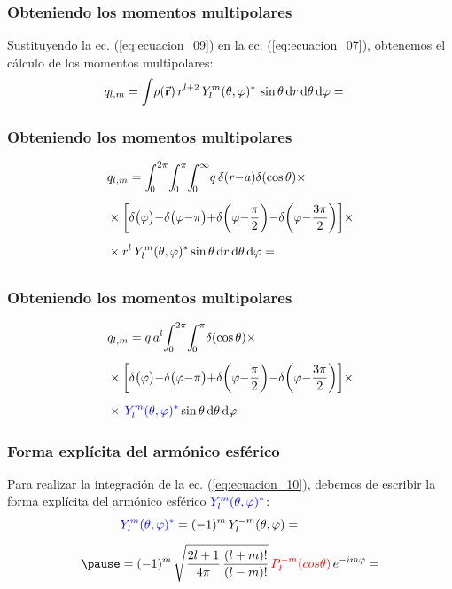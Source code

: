 \documentclass[12pt]{beamer}
\begin{document}
\begin{frame}
\frametitle{Obteniendo los momentos multipolares}
Sustituyendo la ec. (\ref{eq:ecuacion_09}) en la ec. (\ref{eq:ecuacion_07}), obtenemos el cálculo de los momentos multipolares:
\pause
\begin{align*}
&q_{l,m} = \scaleint{5ex} \rho (\va{r}) \, r^{l+2} \, Y_{l}^{m} (\theta, \varphi)^{*} \, \sin \theta \dd{r} \dd{\theta} \dd{\varphi} = 
\end{align*}
\end{frame}
\begin{frame}
\frametitle{Obteniendo los momentos multipolares}
\begin{eqnarray*}
\begin{aligned}
&q_{l,m} = \scaleint{5ex}_{\bs 0}^{2 \pi} \scaleint{5ex}_{\bs 0}^{\pi} \scaleint{5ex}_{\bs 0}^{\infty} q \, \delta(r {-} a) \delta(\cos \theta) \times \\[0.5em] 
&\times \bigg[ \delta \big(\varphi \big) {-} \delta \big(\varphi {-} \pi \big) {+} \delta \bigg( \varphi {-} \dfrac{\pi}{2} \bigg) {-} \delta \bigg(\varphi {-} \dfrac{3 \pi}{2} \bigg) \bigg] \times \\[0.5em]
&\times r^{l} \, Y_{l}^{m} (\theta, \varphi)^{*} \sin \theta \dd{r} \dd{\theta} \dd{\varphi} = \\[0.5em]
\end{aligned}
\end{eqnarray*}
\end{frame}
\begin{frame}
\frametitle{Obteniendo los momentos multipolares}
\begin{eqnarray}
\begin{aligned}[b]
&q_{l,m} = q \, a^{l} \scaleint{5ex}_{\bs 0}^{2 \pi} \scaleint{5ex}_{\bs 0}^{\pi} \delta(\cos \theta) \times \\[0.5em]
&\times \bigg[ \delta \big(\varphi \big) {-} \delta \big(\varphi {-} \pi \big) {+} \delta \bigg( \varphi {-} \dfrac{\pi}{2} \bigg) {-} \delta \bigg(\varphi {-} \dfrac{3 \pi}{2} \bigg) \bigg] \times \\[0.5em]
&\times \, \textcolor{blue}{Y_{l}^{m} (\theta, \varphi)^{*}} \sin \theta \dd{\theta} \dd{\varphi}
\end{aligned}
\label{eq:ecuacion_10}
\end{eqnarray}
\end{frame}
\begin{frame}
\frametitle{Forma explícita del armónico esférico}
Para realizar la integración de la ec. (\ref{eq:ecuacion_10}), debemos de escribir la forma explícita del armónico esférico $\textcolor{blue}{Y_{l}^{m} (\theta, \varphi)^{*}}$:
\pause
\begin{eqnarray*}
\begin{aligned}
&\textcolor{blue}{Y_{l}^{m} (\theta, \varphi)^{*}} = (-1)^{m} \, Y_{l}^{-m} (\theta, \varphi) = \\[0.5em] \pause
&= (-1)^{m} \, \sqrt{\dfrac{2 l + 1}{4 \pi} \, \dfrac{(l + m)!}{(l - m)!}} \, \textcolor{red}{P_{l}^{-m} (cos \theta)} \, e^{-i m \varphi} = 
\end{aligned}
\end{eqnarray*}
\end{frame}
\end{document}
